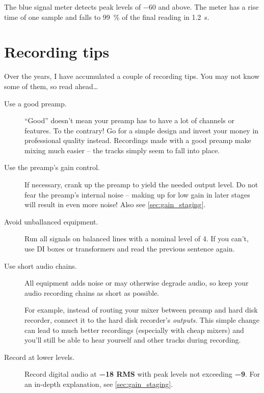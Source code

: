 The blue signal meter detects peak levels of \SI{-60}{\dBFS} and
above.  The meter has a rise time of one sample and falls to
\SI{99}{\percent} of the final reading in \SI{1.2}{\second}.

\chapter{Recording tips}
\label{chap:recording_tips}

Over the years, I have accumulated a couple of recording tips.  You
may not know some of them, so read ahead\dots

\begin{description}

\item[Use a good preamp.]  ``Good'' doesn't mean your preamp has to
  have a lot of channels or features.  To the contrary!  Go for a
  simple design and invest your money in professional quality instead.
  Recordings made with a good preamp make mixing much easier -- the
  tracks simply seem to fall into place.

\item[ Use the preamp's gain control.]  If necessary, crank up the
  preamp to yield the needed output level.  Do not fear the preamp's
  internal noise -- making up for low gain in later stages will result
  in even more noise!  Also see \ref{sec:gain_staging}.

\item[Avoid unballanced equipment.]  Run all signals on balanced lines
  with a nominal level of \SI[addsign=all]{+4}{\dBu}.  If you can't,
  use DI boxes or transformers and read the previous sentence again.

\item[Use short audio chains.]  All equipment adds noise or may
  otherwise degrade audio, so keep your audio recording chains as
  short as possible.

  For example, instead of routing your mixer between preamp and hard
  disk recorder, connect it to the hard disk recorder's
  \emph{outputs}.  This simple change can lead to much better
  recordings (especially with cheap mixers) and you'll still be able
  to hear yourself and other tracks during recording.

\item[Record at lower levels.]  Record digital audio at
  \textbf{\SI{-18}{\dBFS} RMS} with peak levels not exceeding
  \textbf{\SI{-9}{\dBFS}}.  For an in-depth explanation, see
  \ref{sec:gain_staging}.


\end{description}

